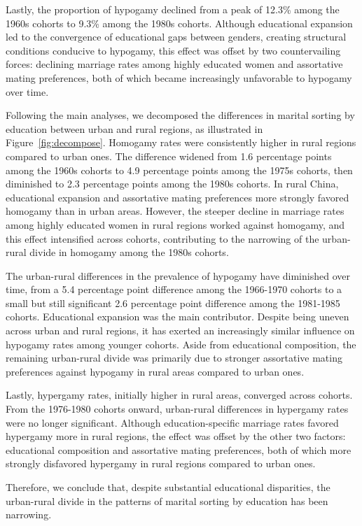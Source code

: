 Lastly, the proportion of hypogamy declined from a peak of 12.3\% among the 1960s cohorts to 9.3\% among the 1980s cohorts. Although educational expansion led to the convergence of educational gaps between genders, creating structural conditions conducive to hypogamy, this effect was offset by two countervailing forces: declining marriage rates among highly educated women and assortative mating preferences, both of which became increasingly unfavorable to hypogamy over time.

Following the main analyses, we decomposed the differences in marital sorting by education between urban and rural regions, as illustrated in Figure~\ref{fig:decompose}. Homogamy rates were consistently higher in rural regions compared to urban ones. The difference widened from 1.6 percentage points among the 1960s cohorts to 4.9 percentage points among the 1975s cohorts, then diminished to 2.3 percentage points among the 1980s cohorts. In rural China, educational expansion and assortative mating preferences more strongly favored homogamy than in urban areas. However, the steeper decline in marriage rates among highly educated women in rural regions worked against homogamy, and this effect intensified across cohorts, contributing to the narrowing of the urban-rural divide in homogamy among the 1980s cohorts.

The urban-rural differences in the prevalence of hypogamy have diminished over time, from a 5.4 percentage point difference among the 1966-1970 cohorts to a small but still significant 2.6 percentage point difference among the 1981-1985 cohorts. Educational expansion was the main contributor. Despite being uneven across urban and rural regions, it has exerted an increasingly similar influence on hypogamy rates among younger cohorts. Aside from educational composition, the remaining urban-rural divide was primarily due to stronger assortative mating preferences against hypogamy in rural areas compared to urban ones.

Lastly, hypergamy rates, initially higher in rural areas, converged across cohorts. From the 1976-1980 cohorts onward, urban-rural differences in hypergamy rates were no longer significant. Although education-specific marriage rates favored hypergamy more in rural regions, the effect was offset by the other two factors: educational composition and assortative mating preferences, both of which more strongly disfavored hypergamy in rural regions compared to urban ones.

Therefore, we conclude that, despite substantial educational disparities, the urban-rural divide in the patterns of marital sorting by education has been narrowing.
